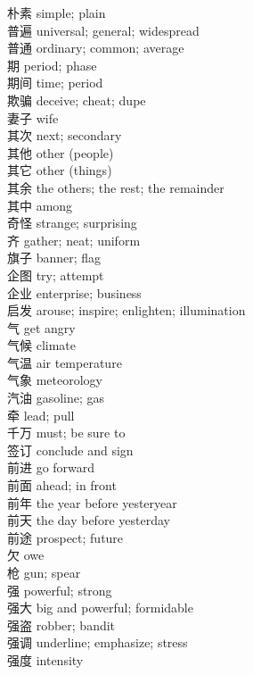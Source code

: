 朴素 \quad simple; plain\\
普遍 \quad universal; general; widespread\\
普通 \quad ordinary; common; average\\
期 \quad period; phase\\
期间 \quad time; period\\
欺骗 \quad deceive; cheat; dupe\\
妻子 \quad wife\\
其次 \quad next; secondary\\
其他 \quad other (people)\\
其它 \quad other (things)\\
其余 \quad the others; the rest; the remainder\\
其中 \quad among\\
奇怪 \quad strange; surprising\\
齐 \quad gather; neat; uniform\\
旗子 \quad banner; flag\\
企图 \quad try; attempt\\
企业 \quad enterprise; business\\
启发 \quad arouse; inspire; enlighten; illumination\\
气 \quad get angry\\
气候 \quad climate\\
气温 \quad air temperature\\
气象 \quad meteorology\\
汽油 \quad gasoline; gas\\
牵 \quad lead; pull\\
千万 \quad must; be sure to\\
签订 \quad conclude and sign\\
前进 \quad go forward\\
前面 \quad ahead; in front\\
前年 \quad the year before yesteryear\\
前天 \quad the day before yesterday\\
前途 \quad prospect; future\\
欠 \quad owe\\
枪 \quad gun; spear\\
强 \quad powerful; strong\\
强大 \quad big and powerful; formidable\\
强盗 \quad robber; bandit\\
强调 \quad underline; emphasize; stress\\
强度 \quad intensity\\
